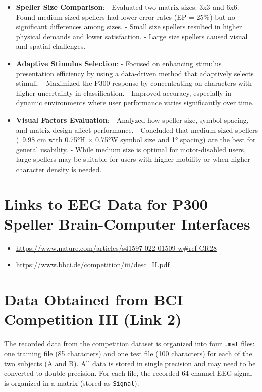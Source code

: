\documentclass{article}
\begin{document}
\begin{itemize}
    \item \textbf{Speller Size Comparison}:
    - Evaluated two matrix sizes: 3x3 and 6x6.
    - Found medium-sized spellers had lower error rates (EP = 25\%) but no significant differences among sizes.
    - Small size spellers resulted in higher physical demands and lower satisfaction.
    - Large size spellers caused visual and spatial challenges.

    \item \textbf{Adaptive Stimulus Selection}:
    - Focused on enhancing stimulus presentation efficiency by using a data-driven method that adaptively selects stimuli.
    - Maximized the P300 response by concentrating on characters with higher uncertainty in classification.
    - Improved accuracy, especially in dynamic environments where user performance varies significantly over time.

    \item \textbf{Visual Factors Evaluation}:
    - Analyzed how speller size, symbol spacing, and matrix design affect performance.
    - Concluded that medium-sized spellers (~9.98 cm with 0.75°H × 0.75°W symbol size and 1° spacing) are the best for general usability.
    - While medium size is optimal for motor-disabled users, large spellers may be suitable for users with higher mobility or when higher character density is needed.
\end{itemize}

\section{Links to EEG Data for P300 Speller Brain-Computer Interfaces}
\begin{itemize}
    \item \url{https://www.nature.com/articles/s41597-022-01509-w#ref-CR28}
    \item \url{https://www.bbci.de/competition/iii/desc_II.pdf}
\end{itemize}

\section{Data Obtained from BCI Competition III (Link 2)}
The recorded data from the competition dataset is organized into four \texttt{.mat} files: one training file (85 characters) and one test file (100 characters) for each of the two subjects (A and B). All data is stored in single precision and may need to be converted to double precision. For each file, the recorded 64-channel EEG signal is organized in a matrix (stored as \texttt{Signal}). 
\end{document}
